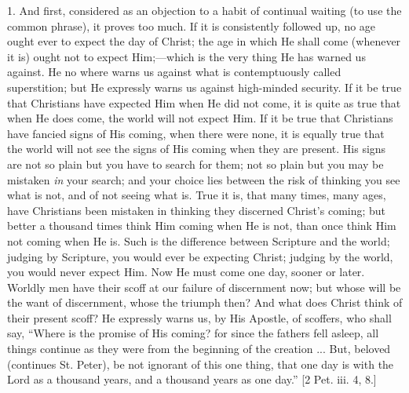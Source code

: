 1. And first, considered as an objection to a habit of continual
waiting (to use the common phrase), it proves too much. If it is
consistently followed up, no age ought ever to expect the day of
Christ; the age in which He shall come (whenever it is) ought not to
expect Him;—which is the very thing He has warned us against. He no
where warns us against what is contemptuously called superstition; but
He expressly warns us against high-minded security. If it be true that
Christians have expected Him when He did not come, it is quite as true
that when He does come, the world will not expect Him. If it be true
that Christians have fancied signs of His coming, when there were
none, it is equally true that the world will not see the signs of His
coming when they are present. His signs are not so plain but you have
to search for them; not so plain but you may be mistaken \emph{in}
your search; and your choice lies between the risk of thinking you see
what is not, and of not seeing what is. True it is, that many times,
many ages, have Christians been mistaken in thinking they discerned
Christ's coming; but better a thousand times think Him coming when He
is not, than once think Him not coming when He is. Such is the
difference between Scripture and the world; judging by Scripture, you
would ever be expecting Christ; judging by the world, you would never
expect Him. Now He must come one day, sooner or later. Worldly men
have their scoff at our failure of discernment now; but whose will be
the want of discernment, whose the triumph then? And what does Christ
think of their present scoff? He expressly warns us, by His Apostle,
of scoffers, who shall say, ``Where is the promise of His coming?
for since the fathers fell asleep, all things continue as they were
from the beginning of the creation ... But, beloved (continues St.
Peter), be not ignorant of this one thing, that one day is with the
Lord as a thousand years, and a thousand years as one day.'' [2
Pet. iii. 4, 8.]

